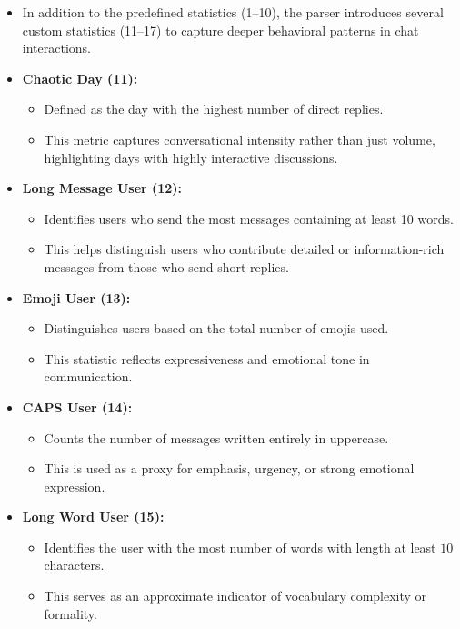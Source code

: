 \documentclass[11pt,a4paper]{article}
\begin{document}
\begin{itemize}
    \item In addition to the predefined statistics (1--10), the parser introduces several custom statistics (11--17) to capture deeper behavioral patterns in chat interactions.

    \item \textbf{Chaotic Day (11):}
    \begin{itemize}
        \item Defined as the day with the highest number of direct replies.
        \item This metric captures conversational intensity rather than just volume, highlighting days with highly interactive discussions.
    \end{itemize}

    \item \textbf{Long Message User (12):}
    \begin{itemize}
        \item Identifies users who send the most messages containing at least 10 words.
        \item This helps distinguish users who contribute detailed or information-rich messages from those who send short replies.
    \end{itemize}

    \item \textbf{Emoji User (13):}
    \begin{itemize}
        \item Distinguishes users based on the total number of emojis used.
        \item This statistic reflects expressiveness and emotional tone in communication.
    \end{itemize}

    \item \textbf{CAPS User (14):}
    \begin{itemize}
        \item Counts the number of messages written entirely in uppercase.
        \item This is used as a proxy for emphasis, urgency, or strong emotional expression.
    \end{itemize}

    \item \textbf{Long Word User (15):}
    \begin{itemize}
        \item Identifies the user with the most number of words with length at least $10$ characters.
        \item This serves as an approximate indicator of vocabulary complexity or formality.
    \end{itemize}


\end{itemize}
\end{document}
